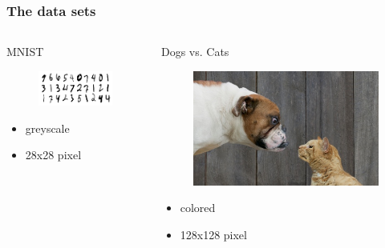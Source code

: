 \documentclass[handout]{beamer}
\begin{document}
\begin{frame}
\frametitle{The data sets} 
\begin{columns}[T]
\begin{column}{0.5\textwidth}
\centering
MNIST
\begin{figure}
\includegraphics[height=0.5\linewidth]{./pictures/MNIST.png}
\end{figure}
\begin{itemize}
\item greyscale
\item 28x28 pixel
\end{itemize}
\end{column}
\begin{column}{0.5\textwidth}
\centering
Dogs vs. Cats
\begin{figure}
\includegraphics[height=0.5\linewidth]{./pictures/dogs_vs_cats.jpg}
\end{figure}
\begin{itemize}
\item colored
\item 128x128 pixel
\end{itemize}
\end{column}
\end{columns}

\end{frame} 
\end{document}
